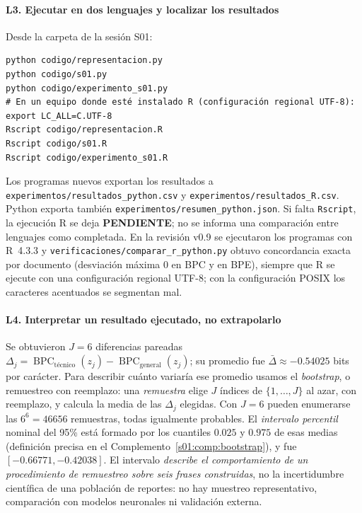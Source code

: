 \paragraph{L3. Ejecutar en dos lenguajes y localizar los resultados}
Desde la carpeta de la sesión S01:
\begin{verbatim}
python codigo/representacion.py
python codigo/s01.py
python codigo/experimento_s01.py
# En un equipo donde esté instalado R (configuración regional UTF-8):
export LC_ALL=C.UTF-8
Rscript codigo/representacion.R
Rscript codigo/s01.R
Rscript codigo/experimento_s01.R
\end{verbatim}
Los programas nuevos exportan los resultados a
\nolinkurl{experimentos/resultados_python.csv} y
\nolinkurl{experimentos/resultados_R.csv}. Python exporta también
\nolinkurl{experimentos/resumen_python.json}. Si falta \texttt{Rscript},
la ejecución R se deja \textbf{PENDIENTE}; no se informa una comparación
entre lenguajes como completada. En la revisión v0.9 se ejecutaron los programas
con R~4.3.3 y \nolinkurl{verificaciones/comparar_r_python.py} obtuvo concordancia
exacta por documento (desviación máxima $0$ en BPC y en BPE), siempre que R se ejecute
con una configuración regional UTF-8; con la configuración POSIX los caracteres
acentuados se segmentan mal.

\paragraph{L4. Interpretar un resultado ejecutado, no extrapolarlo}
\begin{ejemplo}
Se obtuvieron $J=6$ diferencias pareadas
$\Delta_j=\operatorname{BPC}_{\text{técnico}}(z_j)-
\operatorname{BPC}_{\text{general}}(z_j)$; su promedio fue
$\bar\Delta\approx-0.54025$ bits por carácter. Para describir cuánto variaría ese
promedio usamos el \emph{bootstrap}, o remuestreo con reemplazo: una
\emph{remuestra} elige $J$ índices de $\{1,\ldots,J\}$ al azar, con reemplazo, y
calcula la media de las $\Delta_j$ elegidas. Con $J=6$ pueden enumerarse las
$6^6=46656$ remuestras, todas igualmente probables. El \emph{intervalo percentil}
nominal del 95\% está formado por los cuantiles $0.025$ y $0.975$ de esas medias
(definición precisa en el Complemento~\ref{s01:comp:bootstrap}), y fue
$[-0.66771,-0.42038]$.
El intervalo \emph{describe el comportamiento de un procedimiento de
remuestreo sobre seis frases construidas}, no la incertidumbre científica
de una población de reportes: no hay muestreo representativo, comparación
con modelos neuronales ni validación externa.
\end{ejemplo}
